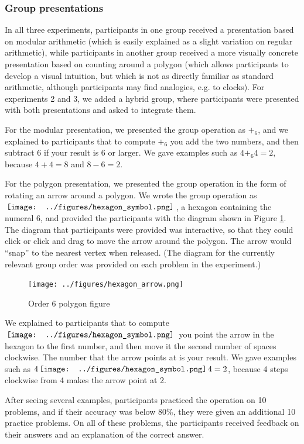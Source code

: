 \documentclass[man,mask,10pt]{apa6}
\newcommand{\hex}{\,\vcenter{\hbox{\texttt{[image: ../figures/hexagon\_symbol.png]}}}\,}
\begin{document}
\subsubsection{Group presentations}
In all three experiments, participants in one group received a presentation based on modular arithmetic (which is easily explained as a slight variation on regular arithmetic), while participants in another group received a more visually concrete presentation based on counting around a polygon (which allows participants to develop a visual intuition, but which is not as directly familiar as standard arithmetic, although participants may find analogies, e.g. to clocks). For experiments 2 and 3, we added a hybrid group, where participants were presented with both presentations and asked to integrate them. \par 
For the modular presentation, we presented the group operation as $+_6$, and we explained to participants that to compute $+_6$ you add the two numbers, and then subtract $6$ if your result is $6$ or larger. We gave examples such as $4 +_6 4 = 2$, because $4+4 = 8$ and $8-6=2$.\par
For the polygon presentation, we presented the group operation in the form of rotating an arrow around a polygon. We wrote the group operation as $\hex$, a hexagon containing the numeral $6$, and provided the participants with the diagram shown in Figure \ref{hexagonex}. The diagram that participants were provided was interactive, so that they could click or click and drag to move the arrow around the polygon. The arrow would ``snap'' to the nearest vertex when released. (The diagram for the currently relevant group order was provided on each problem in the experiment.)
\begin{figure} \centering \texttt{[image: ../figures/hexagon\_arrow.png]} \caption{Order 6 polygon figure} \label{hexagonex} \end{figure} \noindent
We explained to participants that to compute $\hex$ you point the arrow in the hexagon to the first number, and then move it the second number of spaces clockwise. The number that the arrow points at is your result. We gave examples such as $4 \hex 4 = 2$, because 4 steps clockwise from 4 makes the arrow point at 2. \par
After seeing several examples, participants practiced the operation on 10 problems, and if their accuracy was below 80\%, they were given an additional 10 practice problems. On all of these problems, the participants received feedback on their answers and an explanation of the correct answer. \par 
\end{document}
